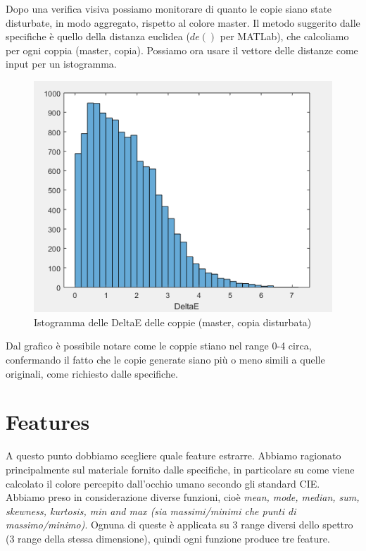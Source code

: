 Dopo una verifica visiva possiamo monitorare di quanto le copie siano state disturbate, in modo aggregato, rispetto al colore master. Il metodo suggerito dalle specifiche è quello della distanza euclidea (\(de()\) per MATLab), che calcoliamo per ogni coppia (master, copia). Possiamo ora usare il vettore delle distanze come input per un istogramma.

\begin{figure}
\begin{center}
	\includegraphics[scale=0.8]{images/rete1-istogramma-deltae.PNG}
\end{center}
\caption{Istogramma delle DeltaE delle coppie (master, copia disturbata)}
\end{figure}

Dal grafico è possibile notare come le coppie stiano nel range 0-4 circa, confermando il fatto che le copie generate siano più o meno simili a quelle originali, come richiesto dalle specifiche.

\section{Features}
A questo punto dobbiamo scegliere quale feature estrarre. Abbiamo ragionato principalmente sul materiale fornito dalle specifiche, in particolare su come viene calcolato il colore percepito dall'occhio umano secondo gli standard CIE. Abbiamo preso in considerazione diverse funzioni, cioè \textit{mean, mode, median, sum, skewness, kurtosis, min and max (sia massimi/minimi che punti di massimo/minimo)}. Ognuna di queste è applicata su 3 range diversi dello spettro (3 range della stessa dimensione), quindi ogni funzione produce tre feature.

